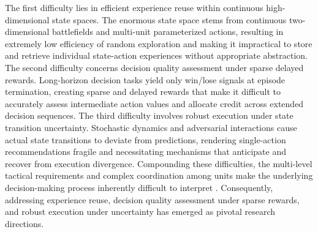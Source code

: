 \documentclass[letterpaper]{article}
\begin{document}
The first difficulty lies in efficient experience reuse within continuous high-dimensional state spaces. The enormous state space stems from continuous two-dimensional battlefields and multi-unit parameterized actions, resulting in extremely low efficiency of random exploration and making it impractical to store and retrieve individual state-action experiences without appropriate abstraction. The second difficulty concerns decision quality assessment under sparse delayed rewards. Long-horizon decision tasks yield only win/lose signals at episode termination, creating sparse and delayed rewards that make it difficult to accurately assess intermediate action values and allocate credit across extended decision sequences. The third difficulty involves robust execution under state transition uncertainty. Stochastic dynamics and adversarial interactions cause actual state transitions to deviate from predictions, rendering single-action recommendations fragile and necessitating mechanisms that anticipate and recover from execution divergence. Compounding these difficulties, the multi-level tactical requirements and complex coordination among units make the underlying decision-making process inherently difficult to interpret \citep{puiutta2020xrl}. Consequently, addressing experience reuse, decision quality assessment under sparse rewards, and robust execution under uncertainty has emerged as pivotal research directions.
\end{document}
